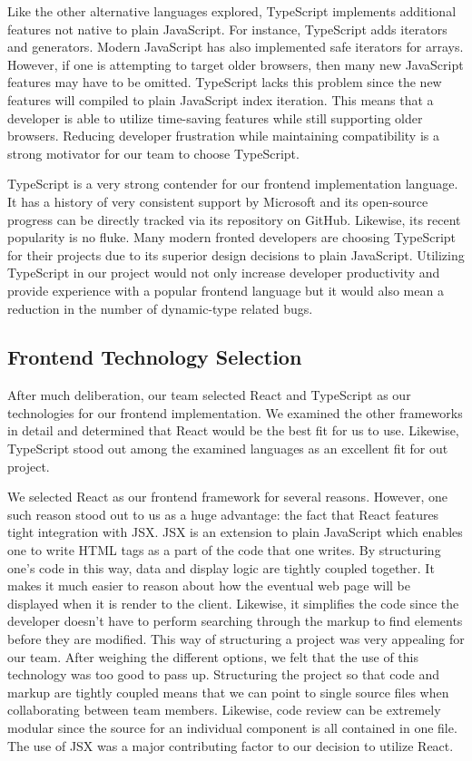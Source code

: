 \documentclass[12pt]{report}
\begin{document}
Like the other alternative languages explored, TypeScript implements additional features not native to plain JavaScript. For instance, TypeScript adds iterators and generators. Modern JavaScript has also implemented safe iterators for arrays. However, if one is attempting to target older browsers, then many new JavaScript features may have to be omitted. TypeScript lacks this problem since the new features will compiled to plain JavaScript index iteration. This means that a developer is able to utilize time-saving features while still supporting older browsers. Reducing developer frustration while maintaining compatibility is a strong motivator for our team to choose TypeScript.

TypeScript is a very strong contender for our frontend implementation language. It has a history of very consistent support by Microsoft and its open-source progress can be directly tracked via its repository on GitHub. Likewise, its recent popularity is no fluke. Many modern fronted developers are choosing TypeScript for their projects due to its superior design decisions to plain JavaScript. Utilizing TypeScript in our project would not only increase developer productivity and provide experience with a popular frontend language but it would also mean a reduction in the number of dynamic-type related bugs.

\subsection*{Frontend Technology Selection}

After much deliberation, our team selected React and TypeScript as our technologies for our frontend implementation. We examined the other frameworks in detail and determined that React would be the best fit for us to use. Likewise, TypeScript stood out among the examined languages as an excellent fit for out project.

We selected React as our frontend framework for several reasons. However, one such reason stood out to us as a huge advantage: the fact that React features tight integration with JSX. JSX is an extension to plain JavaScript which enables one to write HTML tags as a part of the code that one writes. By structuring one's code in this way, data and display logic are tightly coupled together. It makes it much easier to reason about how the eventual web page will be displayed when it is render to the client. Likewise, it simplifies the code since the developer doesn't have to perform searching through the markup to find elements before they are modified. This way of structuring a project was very appealing for our team. After weighing the different options, we felt that the use of this technology was too good to pass up. Structuring the project so that code and markup are tightly coupled means that we can point to single source files when collaborating between team members. Likewise, code review can be extremely modular since the source for an individual component is all contained in one file. The use of JSX was a major contributing factor to our decision to utilize React.
\end{document}
